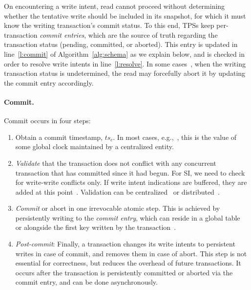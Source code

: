 On encountering a write intent, read cannot proceed without determining whether the tentative write should be included in its snapshot,
for which it must know the writing transaction's commit status. 
To this end, TPSs keep per-transaction \emph{commit entries}, which are the source of truth regarding the transaction status 
(pending, committed, or aborted). 
This entry is updated in line~\ref{l:commit} of Algorithm~\ref{alg:schema} as we explain below, 
and is checked in order to resolve write intents in line~\ref{l:resolve}.
In some cases~\cite{Percolator2010,cockroach,Omid2017}, when the writing transaction status is undetermined, the read may forcefully abort
it by updating the commit entry accordingly.


  \paragraph{Commit.} 
  Commit occurs in four steps:
  \begin{enumerate}
  \item
  Obtain a commit timestamp, $ts_c$. 
  In most cases, e.g.,~\cite{Percolator2010,OmidICDE2014,Omid2017,tephra}, 
  this is the value of some global clock maintained by a centralized entity. 
  \item \emph{Validate} that the transaction does not conflict with any concurrent transaction that has committed since it 
had begun.  For SI, we need to check for write-write conflicts only. 
If write intent indications are buffered, they are added at this point~\cite{Percolator2010}.
Validation can be centralized~\cite{OmidICDE2014,Omid2017,tephra} or distributed~\cite{Percolator2010,cockroach}. 


\item \emph{Commit} or abort in one  irrevocable atomic step. This is achieved by persistently writing to the \emph{commit entry}, 
  which can reside in a global table~\cite{Omid2017,cockroach} or alongside the first  key written by 
  the transaction~\cite{Percolator2010}.  
  
 \item \emph{Post-commit}: 
  Finally, a transaction changes its write intents to
  persistent writes in case of commit, and removes them in case of abort. This
  step is not essential for correctness, but reduces the overhead of future transactions. It
  occurs after the transaction is persistently committed or aborted via the commit entry, 
  and can be done asynchronously.
 \end{enumerate}
 
